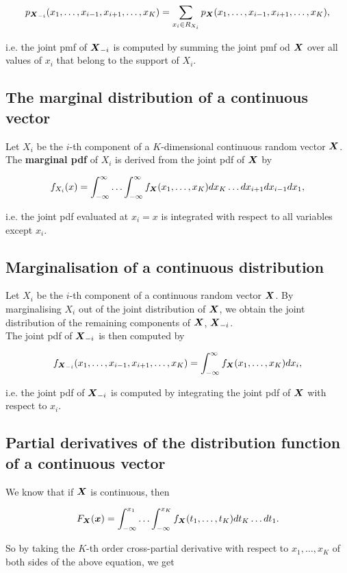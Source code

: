 \documentclass{report}
\begin{document}
	$$p_{\boldsymbol{X}_{-i}}(x_1,\ldots,x_{i-1},x_{i+1},\ldots,x_K)=\sum_{x_i\in R_{X_i}}p_{\boldsymbol{X}}(x_1,\ldots,x_{i-1},x_{i+1},\ldots, x_K),$$
	
	i.e. the joint pmf of $\boldsymbol{X}_{-i}$ is computed by summing the joint pmf od $\boldsymbol{X}$ over all values of $x_i$ that belong to the support of $X_i$.
	
	\subsection{The marginal distribution of a continuous vector} %
	Let $X_i$ be the $i$-th component of a $K$-dimensional continuous random vector $\boldsymbol{X}$. The \textbf{marginal pdf} of $X_i$ is derived from the joint pdf of $\boldsymbol{X}$ by
	
	$$f_{X_i}(x)=\int_{-\infty}^{\infty}\ldots\int_{-\infty}^{\infty}f_{\boldsymbol{X}}(x_1,\ldots,x_{K})dx_K\ldots dx_{i+1}dx_{i-1} dx_1,$$
	
	i.e. the joint pdf evaluated at $x_i=x$ is integrated with respect to all variables except $x_i$.
	
	\subsection{Marginalisation of a continuous distribution} %
	Let $X_i$ be the $i$-th component of a continuous random vector $\boldsymbol{X}$. By marginalising $X_i$ out of the joint distribution of $\boldsymbol{X}$, we obtain the joint distribution of the remaining components of $\boldsymbol{X}$, $\boldsymbol{X}_{-i}$.\\
	
	The joint pdf of $\boldsymbol{X}_{-i}$ is then computed by
	
	$$f_{\boldsymbol{X}_{-i}}(x_1,\ldots,x_{i-1},x_{i+1},\ldots,x_K)=\int_{-\infty}^{\infty}f_{\boldsymbol{X}}(x_1,\ldots,x_K)dx_i,$$
	
	i.e. the joint pdf of $\boldsymbol{X}_{-i}$ is computed by integrating the joint pdf of $\boldsymbol{X}$ with respect to $x_i$.
	
	\subsection{Partial derivatives of the distribution function of a continuous vector} %
	We know that if $\boldsymbol{X}$ is continuous, then
	
	$$F_{\boldsymbol{X}}(\boldsymbol{x})=\int_{-\infty}^{x_1}\ldots\int_{-\infty}^{x_K}f_{\boldsymbol{X}}(t_1,\ldots,t_K)dt_K\ldots dt_1.$$
	
	So by taking the $K$-th order cross-partial derivative with respect to $x_1,\ldots,x_K$ of both sides of the above equation, we get
	
\end{document}
